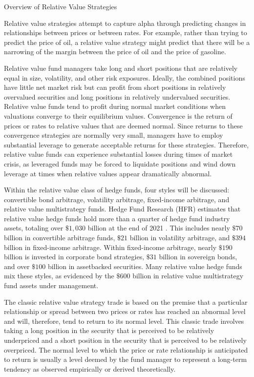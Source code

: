 \documentclass[11pt]{article}
\begin{document}
Overview of Relative Value Strategies

Relative value strategies attempt to capture alpha through predicting changes in relationships between prices or between rates. For example, rather than trying to predict the price of oil, a relative value strategy might predict that there will be a narrowing of the margin between the price of oil and the price of gasoline.

Relative value fund managers take long and short positions that are relatively equal in size, volatility, and other risk exposures. Ideally, the combined positions have little net market risk but can profit from short positions in relatively overvalued securities and long positions in relatively undervalued securities. Relative value funds tend to profit during normal market conditions when valuations converge to their equilibrium values. Convergence is the return of prices or rates to relative values that are deemed normal. Since returns to these convergence strategies are normally very small, managers have to employ substantial leverage to generate acceptable returns for these strategies. Therefore, relative value funds can experience substantial losses during times of market crisis, as leveraged funds may be forced to liquidate positions and wind down leverage at times when relative values appear dramatically abnormal.

Within the relative value class of hedge funds, four styles will be discussed: convertible bond arbitrage, volatility arbitrage, fixed-income arbitrage, and relative value multistrategy funds. Hedge Fund Research (HFR) estimates that relative value hedge funds hold more than a quarter of hedge fund industry assets, totaling over $\$ 1,030$ billion at the end of 2021 . This includes nearly $\$ 70$ billion in convertible arbitrage funds, $\$ 21$ billion in volatility arbitrage, and $\$ 394$ billion in fixed-income arbitrage. Within fixed-income arbitrage, nearly $\$ 190$ billion is invested in corporate bond strategies, $\$ 31$ billion in sovereign bonds, and over $\$ 100$ billion in assetbacked securities. Many relative value hedge funds mix these styles, as evidenced by the $\$ 600$ billion in relative value multistrategy fund assets under management.

The classic relative value strategy trade is based on the premise that a particular relationship or spread between two prices or rates has reached an abnormal level and will, therefore, tend to return to its normal level. This classic trade involves taking a long position in the security that is perceived to be relatively underpriced and a short position in the security that is perceived to be relatively overpriced. The normal level to which the price or rate relationship is anticipated to return is usually a level deemed by the fund manager to represent a long-term tendency as observed empirically or derived theoretically.
\end{document}

